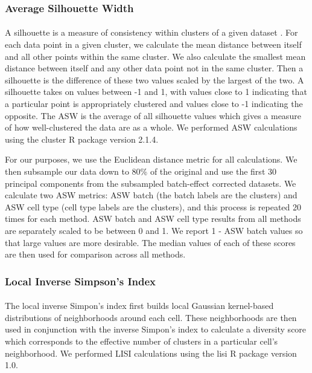 \documentclass[unnumsec,webpdf,contemporary,large]{oup-authoring-template}%
\theoremstyle{thmstyleone}%
\theoremstyle{thmstyletwo}%
\theoremstyle{thmstylethree}%
\begin{document}
\subsubsection*{Average Silhouette Width}

\paragraph*{}
A silhouette is a measure of consistency within clusters of a given dataset \citep{rousseeuw1987silhouettes}. For each data point in a given cluster, we calculate the mean distance between itself and all other points within the same cluster. We also calculate the smallest mean distance between itself and any other data point not in the same cluster. Then a silhouette is the difference of these two values scaled by the largest of the two. A silhouette takes on values between -1 and 1, with values close to 1 indicating that a particular point is appropriately clustered and values close to -1 indicating the opposite. The ASW is the average of all silhouette values which gives a measure of how well-clustered the data are as a whole. We performed ASW calculations using the cluster R package \citep{maechler2022cluster} version 2.1.4.

For our purposes, we use the Euclidean distance metric for all calculations. We then subsample our data down to 80\% of the original and use the first 30 principal components from the subsampled batch-effect corrected datasets. We calculate two ASW metrics: ASW batch (the batch labels are the clusters) and ASW cell type (cell type labels are the clusters), and this process is repeated 20 times for each method. ASW batch and ASW cell type results from all methods are separately scaled to be between 0 and 1. We report 1 - ASW batch values so that large values are more desirable. The median values of each of these scores are then used for comparison across all methods.

\subsubsection*{Local Inverse Simpson's Index}

\paragraph*{}
The local inverse Simpon's index \citep{korsunsky2019fast} first builds local Gaussian kernel-based distributions of neighborhoods around each cell. These neighborhoods are then used in conjunction with the inverse Simpon's index to calculate a diversity score which corresponds to the effective number of clusters in a particular cell's neighborhood. We performed LISI calculations using the lisi R package \citep{korsunky2019lisi} version 1.0.
\end{document}
